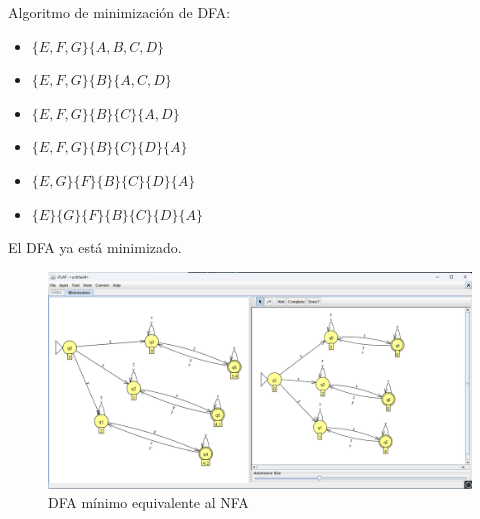 \documentclass[11pt]{report}
\begin{document}
\newpage

Algoritmo de minimización de DFA:
\begin{itemize}
  \item $\{E, F, G\} \{A, B, C, D\}$
  \item $\{E, F, G\} \{B\} \{A, C, D\}$
  \item $\{E, F, G\} \{B\} \{C\} \{A, D\}$
  \item $\{E, F, G\} \{B\} \{C\} \{D\} \{A\}$
  \item $\{E, G\} \{F\} \{B\} \{C\} \{D\} \{A\}$
  \item $\{E\} \{G\} \{F\} \{B\} \{C\} \{D\} \{A\}$
\end{itemize}

El DFA ya está minimizado.
\begin{figure}[H]
  \centering
  \includegraphics[scale=0.45]{img/DFA_to_DFA_minimized_07.png}
  \caption{DFA mínimo equivalente al NFA}
\end{figure}
\end{document}

